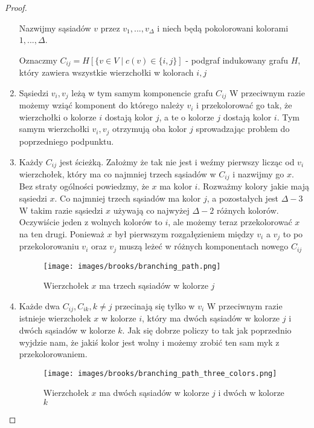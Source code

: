 \begin{proof}
\begin{enumerate}
		      Nazwijmy sąsiadów \(v\) przez \(v_1, ..., v_\Delta\) i niech będą pokolorowani kolorami \(1, ..., \Delta\).

		      Oznaczmy \(C_{ij} = H[\{v \in V \mid c(v) \in \{i, j\}]\) - podgraf indukowany
		      grafu \(H\), który zawiera wszystkie wierzchołki w kolorach \(i, j\)

		\item Sąsiedzi \(v_i, v_j\) leżą w tym samym komponencie grafu \(C_{ij}\)
		      W przeciwnym razie możemy wziąć komponent do którego należy \(v_i\)
		      i przekolorować go tak, że wierzchołki o kolorze \(i\) dostają kolor \(j\),
		      a te o kolorze \(j\) dostają kolor \(i\). Tym samym wierzchołki \(v_i, v_j\)
		      otrzymują oba kolor \(j\) sprowadzając problem do poprzedniego podpunktu.

		\item Każdy \(C_{ij}\) jest ścieżką.
		      Założmy że tak nie jest i weźmy pierwszy licząc od \(v_i\) wierzchołek, który ma co najmniej trzech sąsiadów w \(C_{ij}\) i nazwijmy go \(x\).
		      Bez straty ogólności powiedzmy, że \(x\) ma kolor \(i\).
		      Rozważmy kolory jakie mają sąsiedzi \(x\).
		      Co najmniej trzech sąsiadów ma kolor \(j\), a pozostałych jest \(\Delta - 3\)
		      W takim razie sąsiedzi \(x\) używają co najwyżej \(\Delta - 2\) różnych kolorów. Oczywiście jeden z wolnych kolorów to \(i\), ale możemy teraz przekolorować \(x\) na ten drugi.
		      Ponieważ \(x\) był pierwszym rozgałęzieniem między \(v_i\) a \(v_j\)
		      to po przekolorowaniu \(v_i\) oraz \(v_j\) muszą leżeć w różnych komponentach nowego \(C_{ij}\)

		      \begin{figure}[ht]
			      \centering
			      \texttt{[image: images/brooks/branching\_path.png]}
			      \caption{Wierzchołek \(x\) ma trzech sąsiadów w kolorze \(j\)}
		      \end{figure}

		\item Każde dwa \(C_{ij}, C_{ik}, k \neq j\) przecinają się tylko w \(v_i\)
		      W przeciwnym razie istnieje wierzchołek \(x\) w kolorze \(i\),
		      który ma dwóch sąsiadów w kolorze \(j\) i dwóch sąsiadów w kolorze \(k\).
		      Jak się dobrze policzy to tak jak poprzednio wyjdzie nam, że jakiś kolor jest wolny i możemy zrobić ten sam myk z przekolorowaniem.

		      \begin{figure}[ht]
			      \centering
			      \texttt{[image: images/brooks/branching\_path\_three\_colors.png]}
			      \caption{Wierzchołek \(x\) ma dwóch sąsiadów w kolorze \(j\) i dwóch w kolorze \(k\)}
		      \end{figure}


\end{enumerate}
\end{proof}
